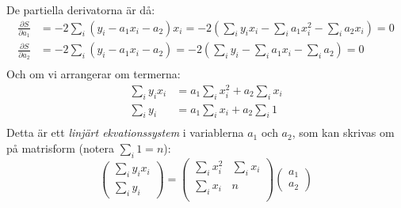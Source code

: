 \documentclass[9pt]{beamer}
\begin{document}
    \begin{frame}
        \onslide<+->
        De partiella derivatorna är då:
        \begin{align*}
            \frac{\partial S}{\partial a_1} &= -2\sum_i(y_i - a_1x_i - a_2)x_i = -2\left(\sum_i y_ix_i - \sum_i a_1 x_i^2 - \sum_i a_2 x_i\right) = 0 \\
            \frac{\partial S}{\partial a_2} &= -2\sum_i (y_i - a_1x_i - a_2) = -2\left(\sum_i y_i - \sum_i a_1x_i - \sum_i a_2\right)= 0 \\
        \end{align*}
        \onslide<+->
        Och om vi arrangerar om termerna:
        \begin{align*}
            \sum_i y_ix_i &= a_1 \sum_i x_i^2 + a_2 \sum_i x_i \\%
            \sum_i y_i &= a_1 \sum_i x_i + a_2 \sum_i 1 \\ %
        \end{align*}
        Detta är ett \emph{linjärt ekvationssystem} i variablerna $a_1$ och $a_2$,
        som kan skrivas om på matrisform (notera $\sum_i 1 = n$):
        \begin{equation*}
            \begin{pmatrix}
                \sum_i y_ix_i \\
                \sum_i y_i
            \end{pmatrix} =
            \begin{pmatrix}
                \sum_i x_i^2 & \sum_ix_i \\
                \sum_i x_i  & n \\
            \end{pmatrix}
            \begin{pmatrix}
                a_1 \\
                a_2
            \end{pmatrix}
        \end{equation*}
    \end{frame}
\end{document}
